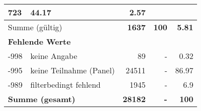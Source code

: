 \begin{longtable}{lXrrr}
       \num{723} &
       \num[round-mode=places,round-precision=2]{44,17} &
         \num[round-mode=places,round-precision=2]{2,57} \\
     \midrule
     \multicolumn{2}{l}{Summe (gültig)} &
       \textbf{\num{1637}} &
     \textbf{100} &
       \textbf{\num[round-mode=places,round-precision=2]{5,81}} \\
     \multicolumn{5}{l}{\textbf{Fehlende Werte}}\\
       -998 &
       keine Angabe &
         \num{89} &
        - &
         \num[round-mode=places,round-precision=2]{0,32} \\
       -995 &
       keine Teilnahme (Panel) &
         \num{24511} &
        - &
         \num[round-mode=places,round-precision=2]{86,97} \\
       -989 &
       filterbedingt fehlend &
         \num{1945} &
        - &
         \num[round-mode=places,round-precision=2]{6,9} \\
     \midrule
     \multicolumn{2}{l}{\textbf{Summe (gesamt)}} &
          \textbf{\num{28182}} &
        \textbf{-} &
        \textbf{100} \\
     \bottomrule
     \end{longtable}
     
